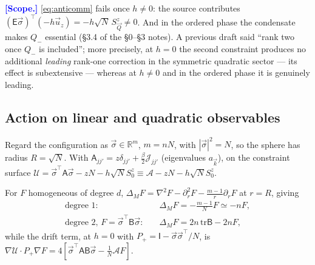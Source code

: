 \documentclass[11pt,a4paper]{article}
\newcommand{\Jc}{\mathcal{J}}
\newcommand{\bk}{\vec k}
\newcommand{\bQ}{\vec Q}
\newcommand{\FLAG}[1]{\textcolor{blue}{\textbf{[#1]}}}
\newcommand{\Jc}{\mathcal{J}}
\newcommand{\Uc}{\mathscr{U}}          %
\newcommand{\Ac}{\mathcal{A}}
\newcommand{\Em}{\mathsf{E}}
\newcommand{\bk}{\vec k}
\newcommand{\bQ}{\vec Q}
\newcommand{\bs}{\vec\sigma}
\newcommand{\FLAG}[1]{\textcolor{blue}{\textbf{[#1]}}}
\begin{document}
\FLAG{Scope.} \eqref{eq:anticomm} fails once $h\neq0$: the source contributes
$(\Em\bs)^\top(-h\vec u_z)=-h\sqrt N\,S^z_{\bQ}\neq0$. And in the ordered phase the
condensate makes $Q_-$ essential (\S3.4 of the \S0--\S3 notes). A previous draft said
``rank two once $Q_-$ is included''; more precisely, at $h=0$ the second constraint produces
no additional \emph{leading} rank-one correction in the symmetric quadratic sector --- its
effect is subextensive --- whereas at $h\neq0$ and in the ordered phase it is genuinely
leading.

\subsection{Action on linear and quadratic observables}
\label{sec:quad}
Regard the configuration as $\bs\in\mathbb R^{m}$, $m=nN$, with $|\bs|^2=N$, so the sphere
has radius $R=\sqrt N$. With $\mathsf A_{jj'}=z\delta_{jj'}+\tfrac\beta2\Jc_{jj'}$
(eigenvalues $a_{\bk}$), on the constraint surface
$\Uc=\bs^\top\mathsf A\bs-zN-h\sqrt N S^z_0\equiv\Ac-zN-h\sqrt N S^z_0$.

For $F$ homogeneous of degree $d$,
$\Delta_MF=\nabla^2F-\partial_r^2F-\frac{m-1}{r}\partial_rF$ at $r=R$, giving
\begin{align}
  \text{degree 1:}\quad &\Delta_M F=-\tfrac{m-1}{N}F\simeq-nF,\\
  \text{degree 2, } F=\bs^\top\mathsf B\bs:\quad &\Delta_M F=2n\,\mathrm{tr}\mathsf B-2nF ,
\end{align}
while the drift term, at $h=0$ with $P_+=\mathsf I-\bs\bs^\top/N$, is
$\nabla\Uc\cdot P_+\nabla F=4[\bs^\top\mathsf A\mathsf B\bs-\tfrac1N\Ac F]$.
\end{document}
